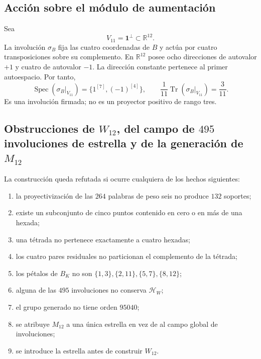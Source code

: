 \subsection{Acción sobre el módulo de aumentación}

Sea
\[
 V_{11}=\mathbf1^\perp\subset\mathbb R^{12}.
\]
La involución \(\sigma_B\) fija las cuatro coordenadas de \(B\) y actúa
por cuatro transposiciones sobre su complemento. En \(\mathbb R^{12}\)
posee ocho direcciones de autovalor \(+1\) y cuatro de autovalor \(-1\).
La dirección constante pertenece al primer autoespacio. Por tanto,
\begin{equation}
 \operatorname{Spec}(\sigma_B|_{V_{11}})
 =\{1^{[7]},(-1)^{[4]}\},
 \qquad
 \frac1{11}\operatorname{Tr}(\sigma_B|_{V_{11}})=\frac3{11}.
 \label{p12-83-c20-s2:eq:espectro-involucion-estrella-aumentacion}
\end{equation}
Es una involución firmada; no es un proyector positivo de rango tres.

\subsection{Obstrucciones de \(W_{12}\), del campo de \(495\) involuciones de estrella y de la generación de \(M_{12}\)}

\begin{criterion}
La construcción queda refutada si ocurre cualquiera de los hechos
siguientes:
\begin{enumerate}
 \item la proyectivización de las \(264\) palabras de peso seis no produce
       \(132\) soportes;
 \item existe un subconjunto de cinco puntos contenido en cero o en más de
       una hexada;
 \item una tétrada no pertenece exactamente a cuatro hexadas;
 \item los cuatro pares residuales no particionan el complemento de la
       tétrada;
 \item los pétalos de \(B_K\) no son
       \(\{1,3\},\{2,11\},\{5,7\},\{8,12\}\);
 \item alguna de las \(495\) involuciones no conserva
       \(\mathcal H_W\);
 \item el grupo generado no tiene orden \(95040\);
 \item se atribuye \(M_{12}\) a una única estrella en vez de al campo
       global de involuciones;
 \item se introduce la estrella antes de construir \(W_{12}\).
\end{enumerate}
\end{criterion}


